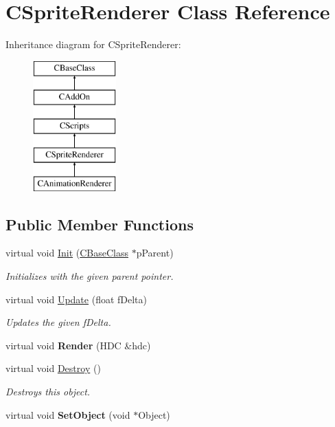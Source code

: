 \hypertarget{class_c_sprite_renderer}{}\section{C\+Sprite\+Renderer Class Reference}
\label{class_c_sprite_renderer}
Inheritance diagram for C\+Sprite\+Renderer\+:\begin{figure}[H]
\begin{center}
\leavevmode
\includegraphics[height=5.000000cm]{class_c_sprite_renderer}
\end{center}
\end{figure}
\subsection*{Public Member Functions}
\begin{DoxyCompactItemize}
\item 
virtual void \hyperlink{class_c_sprite_renderer_aa65eb4db247d6c4683ba8ca599bb4418}{Init} (\hyperlink{class_c_base_class}{C\+Base\+Class} $\ast$p\+Parent)
\begin{DoxyCompactList}\small\item\em Initializes with the given parent pointer. \end{DoxyCompactList}\item 
virtual void \hyperlink{class_c_sprite_renderer_a7923c1ef70f2f8adc172a94ce743e67b}{Update} (float f\+Delta)
\begin{DoxyCompactList}\small\item\em Updates the given f\+Delta. \end{DoxyCompactList}\item 
virtual void {\bfseries Render} (H\+DC \&hdc)\hypertarget{class_c_sprite_renderer_a3583a18e75292e9e192f3b943d4fdd07}{}\label{class_c_sprite_renderer_a3583a18e75292e9e192f3b943d4fdd07}

\item 
virtual void \hyperlink{class_c_sprite_renderer_aa9636c9265209438f35b944a2140357d}{Destroy} ()\hypertarget{class_c_sprite_renderer_aa9636c9265209438f35b944a2140357d}{}\label{class_c_sprite_renderer_aa9636c9265209438f35b944a2140357d}

\begin{DoxyCompactList}\small\item\em Destroys this object. \end{DoxyCompactList}\item 
virtual void {\bfseries Set\+Object} (void $\ast$Object)\hypertarget{class_c_sprite_renderer_a0f28d0ef1f8d0fecf4e43d269344b574}{}\label{class_c_sprite_renderer_a0f28d0ef1f8d0fecf4e43d269344b574}

\end{DoxyCompactItemize}
